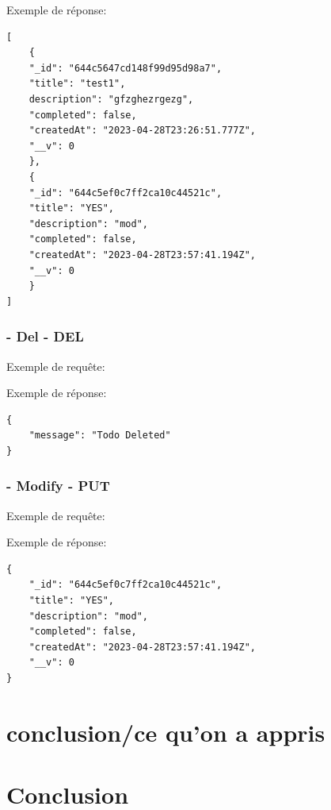 \documentclass[a4paper,12pt]{report}
\begin{document}
Exemple de réponse:
\begin{lstlisting}
[
	{
	"_id": "644c5647cd148f99d95d98a7",
	"title": "test1",
	description": "gfzghezrgezg",
	"completed": false,
	"createdAt": "2023-04-28T23:26:51.777Z",
	"__v": 0
	},
	{
	"_id": "644c5ef0c7ff2ca10c44521c",
	"title": "YES",
	"description": "mod",
	"completed": false,
	"createdAt": "2023-04-28T23:57:41.194Z",
	"__v": 0
	}
]
\end{lstlisting}

\subsection{- Del - DEL}
Exemple de requête:

Exemple de réponse:
\begin{lstlisting}
{
	"message": "Todo Deleted"
}
\end{lstlisting}

\subsection{- Modify - PUT}
Exemple de requête:

Exemple de réponse:
\begin{lstlisting}
{
	"_id": "644c5ef0c7ff2ca10c44521c",
	"title": "YES",
	"description": "mod",
	"completed": false,
	"createdAt": "2023-04-28T23:57:41.194Z",
	"__v": 0
}
\end{lstlisting}

\chapter{conclusion/ce qu'on a appris}

\chapter{Conclusion}
\end{document}

